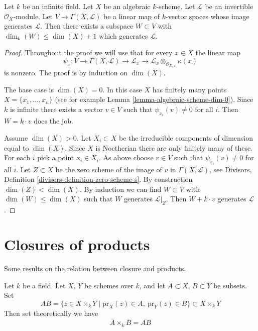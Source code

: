 \begin{lemma}
\label{lemma-generated-by-dim-plus-1-sections}
Let $k$ be an infinite field. Let $X$ be an algebraic $k$-scheme.
Let $\mathcal{L}$ be an invertible $\mathcal{O}_X$-module.
Let $V \to \Gamma(X, \mathcal{L})$ be a linear map of $k$-vector spaces
whose image generates $\mathcal{L}$. Then there exists a subspace
$W \subset V$ with $\dim_k(W) \leq \dim(X) + 1$ which generates $\mathcal{L}$.
\end{lemma}

\begin{proof}
Throughout the proof we will use that for every $x \in X$
the linear map
$$
\psi_x : V \to \Gamma(X, \mathcal{L}) \to \mathcal{L}_x \to
\mathcal{L}_x \otimes_{\mathcal{O}_{X, x}} \kappa(x)
$$
is nonzero. The proof is by induction on $\dim(X)$.

\medskip\noindent
The base case is $\dim(X) = 0$. In this case $X$ has finitely many points
$X = \{x_1, \ldots, x_n\}$ (see for example
Lemma \ref{lemma-algebraic-scheme-dim-0}). Since $k$ is infinite
there exists a vector $v \in V$ such that $\psi_{x_i}(v) \not = 0$
for all $i$. Then $W = k\cdot v$ does the job.

\medskip\noindent
Assume $\dim(X) > 0$. Let $X_i \subset X$ be the irreducible components
of dimension equal to $\dim(X)$. Since $X$ is Noetherian there are only
finitely many of these. For each $i$ pick a point $x_i \in X_i$.
As above choose $v \in V$ such that $\psi_{x_i}(v) \not = 0$
for all $i$. Let $Z \subset X$ be the zero scheme of the image
of $v$ in $\Gamma(X, \mathcal{L})$, see
Divisors, Definition \ref{divisors-definition-zero-scheme-s}.
By construction $\dim(Z) < \dim(X)$. By induction we can find
$W \subset V$ with $\dim(W) \leq \dim(X)$ such that $W$ generates
$\mathcal{L}|_Z$. Then $W + k\cdot v$ generates $\mathcal{L}$.
\end{proof}



\section{Closures of products}
\label{section-closure-of-products}

\noindent
Some results on the relation between closure and products.

\begin{lemma}
\label{lemma-closure-of-product}
Let $k$ be a field.
Let $X$, $Y$ be schemes over $k$, and let
$A \subset X$, $B \subset Y$ be subsets.
Set
$$
AB =
\{z \in X \times_k Y \mid \text{pr}_X(z) \in A, \ \text{pr}_Y(z) \in B\}
\subset X \times_k Y
$$
Then set theoretically we have
$$
\overline{A} \times_k \overline{B} = \overline{AB}
$$
\end{lemma}

